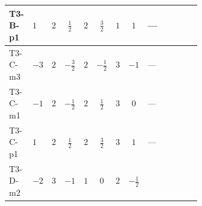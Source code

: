 \documentclass[8pt]{article}
\begin{document}
\begin{landscape}
\begin{longtable}{@{}llcccccc >{\raggedright\arraybackslash}p{0.21\linewidth} >{\raggedright\arraybackslash}p{0.21\linewidth} >{\raggedright\arraybackslash}p{0.21\linewidth}@{}}
\midrule
T3-B-p1 & $1$ & $2$ & $\frac{1}{2}$ & $2$ & $\frac{3}{2}$ & $1$ & $1$ & --- & \scriptsize\adjustbox{max width=\linewidth}{$\begin{gathered} -\frac{9}{4} {g_2}^2 \left({Y_e}\right)_{ij}\end{gathered}$} & \scriptsize\adjustbox{max width=\linewidth}{$\begin{gathered} -\frac{15}{4} {g_1}^2 \left({Y_e}\right)_{ij}\end{gathered}$} \\
\midrule
T3-C-m3 & $-3$ & $2$ & $-\frac{3}{2}$ & $2$ & $-\frac{1}{2}$ & $3$ & $-1$ & --- & \scriptsize\adjustbox{max width=\linewidth}{$\begin{gathered} -\frac{9}{4} {g_2}^2 \left({Y_e}\right)_{ij}\end{gathered}$} & \scriptsize\adjustbox{max width=\linewidth}{$\begin{gathered} -\frac{15}{4} {g_1}^2 \left({Y_e}\right)_{ij}\end{gathered}$} \\
\midrule
T3-C-m1 & $-1$ & $2$ & $-\frac{1}{2}$ & $2$ & $\frac{1}{2}$ & $3$ & $0$ & --- & \scriptsize\adjustbox{max width=\linewidth}{$\begin{gathered} -\frac{9}{4} {g_2}^2 \left({Y_e}\right)_{ij}\end{gathered}$} & \scriptsize\adjustbox{max width=\linewidth}{$\begin{gathered} -\frac{15}{4} {g_1}^2 \left({Y_e}\right)_{ij}\end{gathered}$} \\
\midrule
T3-C-p1 & $1$ & $2$ & $\frac{1}{2}$ & $2$ & $\frac{3}{2}$ & $3$ & $1$ & --- & \scriptsize\adjustbox{max width=\linewidth}{$\begin{gathered} -\frac{9}{4} {g_2}^2 \left({Y_e}\right)_{ij}\end{gathered}$} & \scriptsize\adjustbox{max width=\linewidth}{$\begin{gathered} -\frac{15}{4} {g_1}^2 \left({Y_e}\right)_{ij}\end{gathered}$} \\
\midrule
T3-D-m2 & $-2$ & $3$ & $-1$ & $1$ & $0$ & $2$ & $-\frac{1}{2}$ & \scriptsize\adjustbox{max width=\linewidth}{$\begin{gathered} +\frac{1}{4} (3 \left({y_1}\,\left({y_1}\right)^{\dagger}\,{Y_e}\right)_{ij}+2 \left({y_2}\,\left({y_2}\right)^{\dagger}\,{Y_e}\right)_{ij}+6 \left({Y_e}\,\left({Y_e}\right)^{\dagger}\,{Y_e}\right)_{ij})\end{gathered}$} & \scriptsize\adjustbox{max width=\linewidth}{$\begin{gathered} -\frac{9}{4} {g_2}^2 \left({Y_e}\right)_{ij}\end{gathered}$} & \scriptsize\adjustbox{max width=\linewidth}{$\begin{gathered} -\frac{15}{4} {g_1}^2 \left({Y_e}\right)_{ij}\end{gathered}$} \\

\end{longtable}
\end{landscape}
\end{document}
